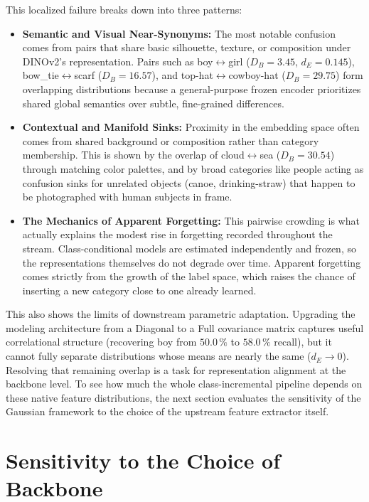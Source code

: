 This localized failure breaks down into three patterns:
\begin{itemize}
	\item \textbf{Semantic and Visual Near-Synonyms:} The most notable confusion comes from pairs that share basic silhouette, texture, or composition under DINOv2's representation.  Pairs such as boy$\leftrightarrow$girl ($D_B = 3.45$, $d_E = 0.145$), bow\_tie$\leftrightarrow$scarf ($D_B = 16.57$), and top-hat$\leftrightarrow$cowboy-hat ($D_B = 29.75$) form overlapping distributions because a general-purpose frozen encoder prioritizes shared global semantics over subtle, fine-grained differences.
	
	\item \textbf{Contextual and Manifold Sinks:} Proximity in the embedding space often comes from shared background or composition rather than category membership. This is shown by the overlap of cloud$\leftrightarrow$sea ($D_B = 30.54$) through matching color palettes, and by broad categories like people acting as confusion sinks for unrelated objects (canoe, drinking-straw) that happen to be photographed with human subjects in frame.
	\item \textbf{The Mechanics of Apparent Forgetting:} This pairwise crowding is what actually explains the modest rise in forgetting recorded throughout the stream. Class-conditional models are estimated independently and frozen, so the representations themselves do not degrade over time. Apparent forgetting comes strictly from the growth of the label space, which raises the chance of inserting a new category close to one already learned.
\end{itemize}

This also shows the limits of downstream parametric adaptation. Upgrading the modeling architecture from a Diagonal to a Full covariance matrix captures useful correlational structure (recovering boy from $50.0\,\%$ to $58.0\,\%$ recall), but it cannot fully separate distributions whose means are nearly the same ($d_E \to 0$). Resolving that remaining overlap is a task for representation alignment at the backbone level. To see how much the whole class-incremental pipeline depends on these native feature distributions, the next section evaluates the sensitivity of the Gaussian framework to the choice of the upstream feature extractor itself.

\section{Sensitivity to the Choice of Backbone}
\label{sec:backbone_results}
\label{sec:method:backbones}

